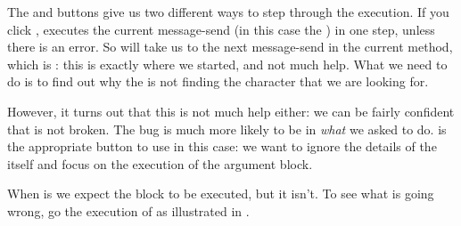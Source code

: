 \documentclass[a4paper,10pt,twoside]{book}
\begin{document}
The  and  buttons give us two different ways to step through the execution.  If you click , \sq executes the current message-send (in this case the ) in one step, unless there is an error.  
So  will take us to the next message-send in the current method, which is : this is exactly where we started, and not much help. 
What we need to do is to find out why the  is not finding the character that we are looking for.



However, it turns out that this is not much help either: we can be fairly confident that  is not broken.  The bug is much more likely to be in \emph{what} we asked \sq to do.
 is the appropriate button to use in this case: we want to ignore the details of the  itself and focus on the execution of the argument block. 


When  is  we expect the  block to be executed, but it isn't.
To see what is going wrong, go  the execution of  as illustrated in .
\end{document}
